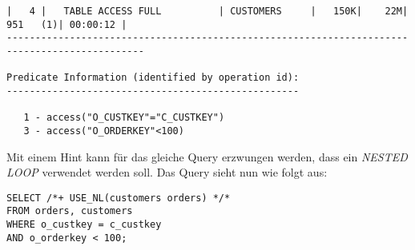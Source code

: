 \documentclass[11pt,a4paper,parskip=half]{scrartcl}
\begin{document}
\begin{lstlisting}
|   4 |   TABLE ACCESS FULL          | CUSTOMERS     |   150K|    22M|   951   (1)| 00:00:12 |                                                                                                                                                                                                               
----------------------------------------------------------------------------------------------                                                                                                                                                                                                               
                                                                                                                                                                                                                                                                                                             
Predicate Information (identified by operation id):                                                                                                                                                                                                                                                          
---------------------------------------------------                                                                                                                                                                                                                                                          
                                                                                                                                                                                                                                                                                                             
   1 - access("O_CUSTKEY"="C_CUSTKEY")                                                                                                                                                                                                                                                                       
   3 - access("O_ORDERKEY"<100)                                                                                                                                                                                                                                                                              
\end{lstlisting}

Mit einem Hint kann für das gleiche Query erzwungen werden, dass ein \emph{NESTED LOOP} verwendet werden soll. Das Query sieht nun wie folgt aus:
\begin{lstlisting}
SELECT /*+ USE_NL(customers orders) */*
FROM orders, customers
WHERE o_custkey = c_custkey
AND o_orderkey < 100;
\end{lstlisting}
\end{document}
